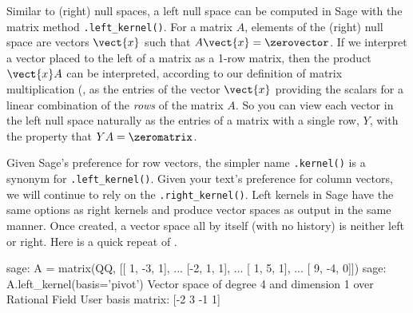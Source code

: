 Similar to (right) null spaces, a left null space can be computed in Sage with the matrix method \verb?.left_kernel()?.  For a matrix $A$, elements of the (right) null space are vectors $\vect{x}$ such that $A\vect{x}=\zerovector$.  If we interpret a vector placed to the left of a matrix as a 1-row matrix, then the product $\vect{x}A$ can be interpreted, according to our definition of matrix multiplication (, as the entries of the vector $\vect{x}$ providing the scalars for a linear combination of the \emph{rows} of the matrix $A$.  So you can view each vector in the left null space naturally as the entries of a matrix with a single row, $Y$, with the property that $YA=\zeromatrix$.  \par
%
Given Sage's preference for row vectors, the simpler name \verb?.kernel()? is a synonym for \verb?.left_kernel()?.  Given your text's preference for column vectors, we will continue to rely on the \verb?.right_kernel()?.  Left kernels in Sage have the same options as right kernels and produce vector spaces as output in the same manner.  Once created, a vector space all by itself (with no history) is neither left or right.  Here is a quick repeat of .
%
\begin{sageexample}
sage: A = matrix(QQ, [[ 1, -3, 1],
...                   [-2,  1, 1],
...                   [ 1,  5, 1],
...                   [ 9, -4, 0]])
sage: A.left_kernel(basis='pivot')
Vector space of degree 4 and dimension 1 over Rational Field
User basis matrix:
[-2  3 -1  1]
\end{sageexample}
%
%
\begin{sageverbatim}
\end{sageverbatim}
%
